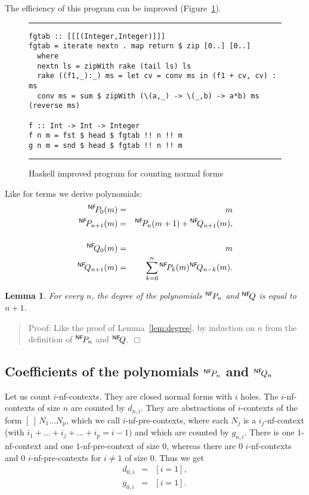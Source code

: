 \documentclass{jfp1}
\newenvironment{proof}[1]{\begin{quotation}\noindent\textsf{Proof:} #1}
{\(\Box\)\end{quotation}}
\newtheorem{lemma}[theo]{Lemma}
\newcommand{\PNF}{{}^{\tiny \textsf{NF}}\!P}
\newcommand{\QNF}{{}^{\tiny \textsf{NF}}\!Q}
\begin{document}
The efficiency of this program can be improved (Figure~\ref{fig:nf-imp-program}).
\begin{figure}[!htb]
  \centering
\hrule

\medskip

\begin{verbatim}
fgtab :: [[[(Integer,Integer)]]]
fgtab = iterate nextn . map return $ zip [0..] [0..]
  where
  nextn ls = zipWith rake (tail ls) ls
  rake ((f1,_):_) ms = let cv = conv ms in (f1 + cv, cv) : ms
  conv ms = sum $ zipWith (\(a,_) -> \(_,b) -> a*b) ms (reverse ms)

f :: Int -> Int -> Integer
f n m = fst $ head $ fgtab !! n !! m
g n m = snd $ head $ fgtab !! n !! m
\end{verbatim}
\hrule
  \caption{\textsf{Haskell} improved program for counting normal forms}
  \label{fig:nf-imp-program}
\end{figure}
 Like for terms we derive polynomials:
\begin{eqnarray*}
  \PNF_0(m) &=& m \\
  \PNF_{n+1}(m) &=& \PNF_n(m+1) + \QNF_{n+1}(m),\\\\
  \QNF_0(m) &=& m \\
  \QNF_{n+1}(m) &=& \sum_{k=0}^{n} \PNF_k(m) \QNF_{n-k}(m).
\end{eqnarray*}
\begin{lemma}
For every $n$, the degree of the polynomials $\PNF_n$ and $\QNF$ is equal to $n+1$.
\end{lemma}
\begin{proof}
  Like the proof of Lemma~\ref{lem:degree},  by induction on $n$ from the definition of
  $\PNF_n$ and $\QNF$.
\end{proof}


\subsection{Coefficients of the polynomials $\PNF_n$ and $\QNF_n$}

Let us count $i$-nf-contexts.  They are closed normal forms with $i$ holes.  The
$i$-nf-contexts of size $n$ are counted by $d_{n,i}$. They are abstractions of
$i$-contexts of the form $[\ ]\,N_1\ldots N_p$, which we call $i$-nf-pre-contexts,
where each $N_j$ is a $i_j$-nf-context (with $i_1+\ldots+i_j+\ldots+i_p = i-1$) and
which are counted by $g_{n,i}$.  There is one $1$-nf-context and one
$1$-nf-pre-context of size $0$, whereas there are $0$ $i$-nf-contexts and $0$
$i$-nf-pre-contexts for $i\neq 1$ of size $0$. Thus we get
\begin{eqnarray*}
  d_{0,i} &=& [i = 1],\\
  g_{0,i} &=& [i = 1].
\end{eqnarray*}
\end{document}
